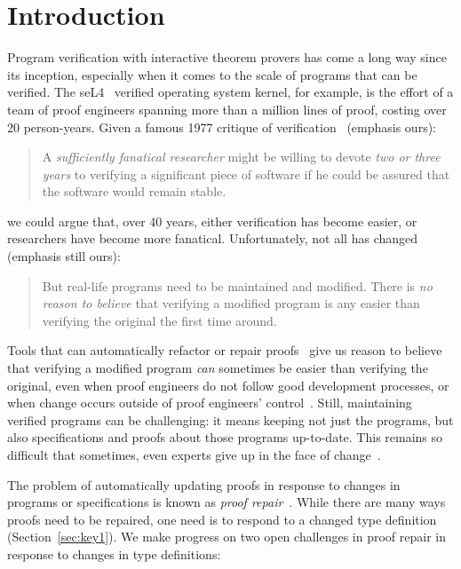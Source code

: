 \section{Introduction}

Program verification with interactive theorem provers has come a long way since its inception,
especially when it comes to the scale of programs that can be verified.
The seL4~\cite{Klein2009} verified operating system kernel, for example,
is the effort of a team of proof engineers spanning more than
a million lines of proof, costing over 20 person-years.
Given a famous 1977 critique of verification~\cite{DeMillo1977} (emphasis ours):

\begin{quote}
A \textit{sufficiently fanatical researcher}
might be willing to devote \textit{two or 
three years} to verifying a significant 
piece of software if he could be 
assured that the software would remain stable.
\end{quote}
we could argue that, over 40 years, either verification has become easier,
or researchers have become more fanatical. Unfortunately, not all has changed (emphasis still ours):

\begin{quote}
But real-life programs need to 
be maintained and modified. 
There is \textit{no reason to believe} that verifying a modified program is any 
easier than verifying the original the 
first time around.
\end{quote}
Tools that can automatically refactor or repair proofs~\cite{wibergh2019, WhitesidePhD, Dietrich2013, adams2015, Bourke12, Roe2016, robert2018, pumpkinpatch}
give us reason to believe that verifying a modified program \textit{can} sometimes be easier than verifying the original, even when proof engineers do not follow good development processes,
or when change occurs outside of proof engineers' control~\cite{PGL-045}.
Still, maintaining verified programs can be challenging: it means keeping not just the programs, but also specifications and proofs about those programs up-to-date.
This remains so difficult that sometimes, even experts give up in the face of change~\cite{replica}.

The problem of automatically updating proofs in response to changes in programs or specifications is known as \textit{proof repair}~\cite{PGL-045, pumpkinpatch}.
While there are many ways proofs need to be repaired, one need is to respond to a changed type definition (Section~\ref{sec:key1}).
We make progress on two open challenges in proof repair in response to changes in type definitions:

